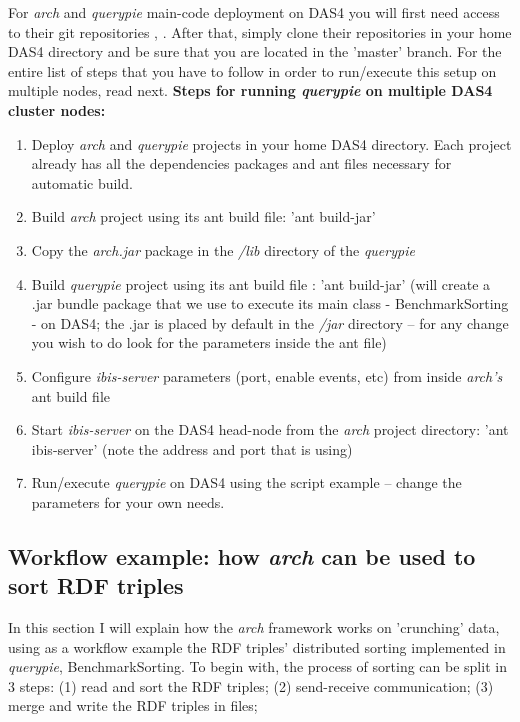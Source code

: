 For \textit{arch} and \textit{querypie} main-code deployment on DAS4 you will first need access to their git repositories \cite{arch_repo}, \cite{qpie_repo}. After that, simply clone their repositories in your home DAS4 directory and be sure that you are located in the 'master' branch. For the entire list of steps that you have to follow in order to run/execute this setup on multiple nodes, read next.
\newline
\newline
\textbf{Steps for running \textit{querypie} on multiple DAS4 cluster nodes:}
\begin{enumerate}
	\item Deploy \textit{arch} and \textit{querypie} projects in your home DAS4 directory. Each project already has all the dependencies packages and ant files necessary for automatic build. 
	\item Build \textit{arch} project using its ant build file: 'ant build-jar' 
	\item Copy the \textit{arch.jar} package in the \textit{/lib} directory of the \textit{querypie}
	\item Build \textit{querypie} project using its ant build file \cite{build_file}: 'ant build-jar' (will create a .jar bundle package that we use to execute its main class - BenchmarkSorting - on DAS4; the .jar is placed by default in the \textit{/jar} directory -- for any change you wish to do look for the parameters inside the ant file)
	\item Configure \textit{ibis-server} parameters (port, enable events, etc) from inside \textit{arch's} ant build file 
	\item Start \textit{ibis-server} on the DAS4 head-node from the \textit{arch} project directory: 'ant ibis-server' (note the address and port that is using)
	\item Run/execute \textit{querypie} on DAS4 using the script example \cite{run_on_das4} -- change the parameters for your own needs.
\end{enumerate}

% 
\subsection{Workflow example: how \textit{arch} can be used to sort RDF triples}

In this section I will explain how the \textit{arch} framework works on 'crunching' data, using as a workflow example the RDF triples' distributed sorting implemented in \textit{querypie}, BenchmarkSorting. To begin with, the process of sorting can be split in 3 steps: (1) read and sort the RDF triples; (2) send-receive communication; (3) merge and write the RDF triples in files;

